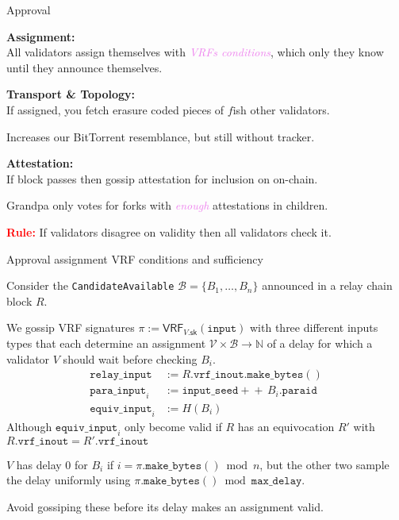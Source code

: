 \documentclass{beamer}
\begin{document}
\begin{frame}[t]{Approval}

{\bf Assignment:}  \\ \smallskip
All validators assign themselves with \textcolor{violet}{\em VRFs conditions}, which
only they know until they announce themselves.

\bigskip

{\bf Transport \& Topology:} \\ \smallskip
If assigned, you fetch erasure coded pieces of $f$ish other validators. \\ \smallskip

\hspace*{5pt} Increases our BitTorrent resemblance, but still without tracker.

\bigskip

{\bf Attestation:}  \\ \smallskip
If block passes then gossip attestation for inclusion on on-chain.

Grandpa only votes for forks with \textcolor{violet}{\em enough} attestations in children.

\bigskip\bigskip

\textcolor{red}{\bf Rule:}  If validators disagree on validity then all validators check it.


\end{frame}


\begin{frame}[t]{Approval assignment VRF conditions and sufficiency}

Consider the \texttt{CandidateAvailable} $\mathcal{B} = \{ B_1,\ldots,B_n \}$ announced in a relay chain block $R$.  \\ \smallskip

We gossip VRF signatures $\pi := \mathsf{VRF}_{V.\mathsf{sk}}(\mathtt{input})$ with three different inputs types that each determine an assignment $\mathcal{V} \times \mathcal{B} \to \mathbb{N}$ of a delay for which a validator $V$ should wait before checking $B_i$. 
\vspace{-2pt}
\begin{align*} 
\mathtt{relay\_input}  &:= R.\mathtt{vrf\_inout}.\mathtt{make\_bytes}() \\
\mathtt{para\_input}_i &:= \mathtt{input\_seed} +\!\!\!\!+\, B_i.\mathtt{paraid} \\
\mathtt{equiv\_input}_i &:= H(B_i) 
\end{align*}
Although $\mathtt{equiv\_input}_i$ only become valid if $R$ has an equivocation $R'$ with $R.\mathtt{vrf\_inout} = R'.\mathtt{vrf\_inout}$

$V$ has delay 0 for $B_i$ if $i = \pi.\mathtt{make\_bytes}() \bmod n$, but the other two sample the delay uniformly using $\pi.\mathtt{make\_bytes}() \bmod \mathtt{max\_delay}$.

Avoid gossiping these before its delay makes an assignment valid.


\end{frame}
\end{document}
